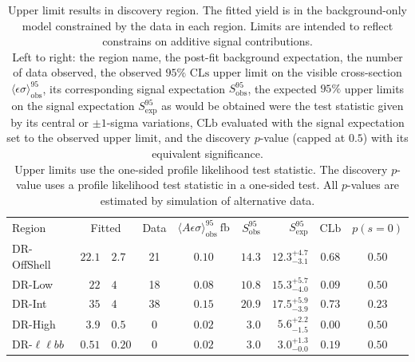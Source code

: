 \FloatBarrier
\begin{table}[tp]
\centering
\begin{tabular*}{\textwidth}{lr@{$~\pm~$}lccrrcc}
Region &
\multicolumn{2}{c}{Fitted} &
Data &
$\langle A\epsilon{ \sigma}\rangle_{\mathrm{obs}}^{95}~\mathrm{fb}$ &
$S_{\mathrm{obs}}^{95}$  &
$S_{\mathrm{exp}}^{95}$ &
$\mathrm{CLb}$ &
$p(s=0)$  \\[1.5ex]
DR-OffShell      & $22.1$ & $2.7$ & 21 & $0.10$ & $14.3$ & $12.3^{+4.7}_{-3.1}$ & $0.68$ & $0.50$ \\[.5ex]
DR-Low           & $22$ & $4$ & 18 & $0.08$ & $10.8$ & $15.3^{+5.7}_{-4.0}$ & $0.09$ & $0.50$ \\[.5ex]
DR-Int           & $35$ & $4$ & 38 & $0.15$ & $20.9$ & $17.5^{+5.9}_{-3.9}$ & $0.73$ & $0.23$ \\[.5ex]
DR-High          & $3.9$ & $0.5$  & 0  & $0.02$ & $3.0$ & $5.6^{+2.2}_{-1.5}$ & $0.00$ & $0.50$ \\[.5ex]
DR-$\ell\ell bb$ & $0.51$ & $0.20$  & 0  & $0.02$ & $3.0$ & $3.0^{+1.3}_{-0.0}$ & $0.19$ & $0.50$ \\[.5ex]
\end{tabular*}
\caption{%
Upper limit results in discovery region.
The fitted yield is in the background-only model constrained by the data in each region.
Limits are intended to reflect constrains on additive signal contributions.
\\[0.5em]
Left to right:
the region name,
the post-fit background expectation,
the number of data observed,
the observed $95\%$ $\mathrm{CLs}$ upper limit on the visible cross-section
$\langle\epsilon\sigma\rangle_\mathrm{obs}^{95}$,
its corresponding signal expectation $S_\mathrm{obs}^{95}$,
the expected $95\%$ upper limits on the signal expectation $S_\mathrm{exp}^{95}$
as would be obtained were the test statistic given by its central or
$\pm1$-sigma variations,
$\mathrm{CLb}$ evaluated with the signal expectation set to the observed upper limit,
and the discovery $p$-value (capped at $0.5$) with its equivalent significance.
\\[0.5em]
Upper limits use the one-sided profile likelihood test statistic.
The discovery $p$-value uses a profile likelihood test statistic in a one-sided test.
All $p$-values are estimated by simulation of alternative data.
}
\label{tab:2ljets_discovery}
\end{table}


